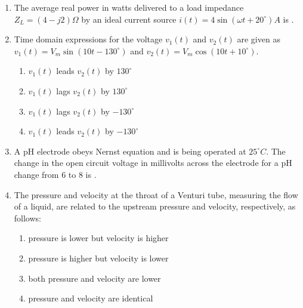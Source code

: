 \documentclass[journal,12pt,onecolumn]{IEEEtran}
\theoremstyle{remark}
\begin{document}
\begin{enumerate}
    \item The average real power in watts delivered to a load impedance $Z_L = (4 - j2)\Omega$ by an ideal current source $i(t) = 4 \sin(\omega t + 20^\circ) A$ is \underline{\hspace{2cm}}.

    \vspace{0.5cm}
    
    \item Time domain expressions for the voltage $v_1(t)$ and $v_2(t)$ are given as $v_1(t) = V_m \sin(10t - 130^\circ)$ and $v_2(t) = V_m \cos(10t + 10^\circ)$.
    \begin{multicols}{2}
        \begin{enumerate}
            \item $v_1(t)$ leads $v_2(t)$ by $130^\circ$
            \item $v_1(t)$ lags $v_2(t)$ by $130^\circ$
            \item $v_1(t)$ lags $v_2(t)$ by $-130^\circ$
            \item $v_1(t)$ leads $v_2(t)$ by $-130^\circ$
        \end{enumerate}
    \end{multicols}

    \item A pH electrode obeys Nernst equation and is being operated at $25^\circ C$. The change in the open circuit voltage in millivolts across the electrode for a pH change from 6 to 8 is \underline{\hspace{2cm}}.

    \vspace{0.5cm}
    
    \item The pressure and velocity at the throat of a Venturi tube, measuring the flow of a liquid, are related to the upstream pressure and velocity, respectively, as follows:
    \begin{enumerate}
        \item pressure is lower but velocity is higher
        \item pressure is higher but velocity is lower
        \item both pressure and velocity are lower
        \item pressure and velocity are identical
    \end{enumerate}

    \vspace{0.5cm}
    

\end{enumerate}
\end{document}
